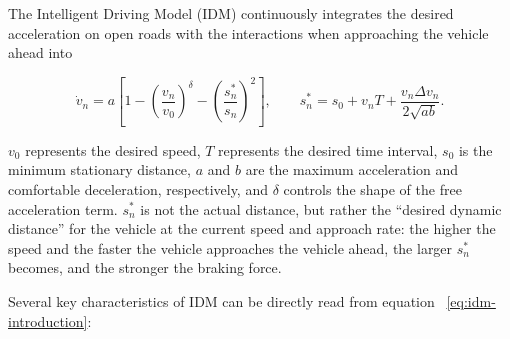 \documentclass[11pt,a4paper,openany]{book}
\numberwithin{equation}{chapter}
\numberwithin{figure}{chapter}
\numberwithin{table}{chapter}
\begin{document}
The Intelligent Driving Model (IDM) continuously integrates the desired acceleration on open roads with the interactions when approaching the vehicle ahead into \cite{treiber2000}

\begin{equation}
\dot v_n
=a\left[
1-\left(\frac{v_n}{v_0}\right)^\delta
-\left(\frac{s_n^*}{s_n}\right)^2
\right],
\qquad
s_n^*=s_0+v_nT+
\frac{v_n\Delta v_n}{2\sqrt{ab}}.
\label{eq:idm-introduction}
\end{equation}

$v_0$ represents the desired speed, $T$ represents the desired time interval, $s_0$ is the minimum stationary distance, $a$ and $b$ are the maximum acceleration and comfortable deceleration, respectively, and $\delta$ controls the shape of the free acceleration term. $s_n^*$ is not the actual distance, but rather the “desired dynamic distance” for the vehicle at the current speed and approach rate: the higher the speed and the faster the vehicle approaches the vehicle ahead, the larger $s_n^*$ becomes, and the stronger the braking force.




Several key characteristics of IDM can be directly read from equation ~\eqref{eq:idm-introduction}:
\end{document}
